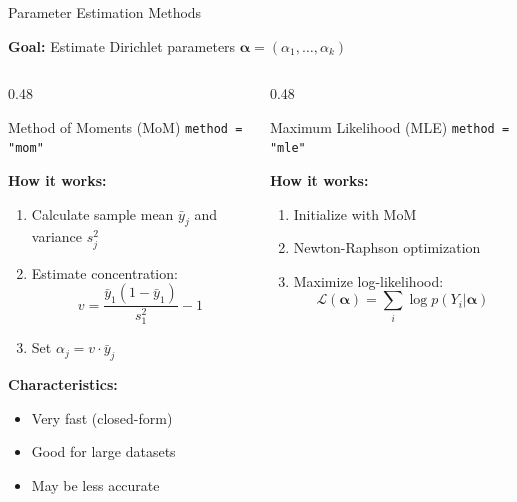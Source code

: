 \documentclass[aspectratio=169]{beamer}
\begin{document}
\begin{frame}{Parameter Estimation Methods}

\textbf{Goal:} Estimate Dirichlet parameters $\boldsymbol{\alpha} = (\alpha_1, \ldots, \alpha_k)$

\vspace{0.3cm}

\begin{columns}[T]

\begin{column}{0.48\textwidth}
\begin{block}{Method of Moments (MoM)}
\texttt{method = "mom"}
\end{block}

\textbf{How it works:}
\begin{enumerate}
\item Calculate sample mean $\bar{y}_j$ and variance $s_j^2$
\item Estimate concentration: 
$$v = \frac{\bar{y}_1(1-\bar{y}_1)}{s_1^2} - 1$$
\item Set $\alpha_j = v \cdot \bar{y}_j$
\end{enumerate}

\vspace{0.2cm}

\textbf{Characteristics:}
\begin{itemize}
\item Very fast (closed-form)
\item Good for large datasets
\item May be less accurate
\end{itemize}

\end{column}

\begin{column}{0.48\textwidth}
\begin{block}{Maximum Likelihood (MLE)}
\texttt{method = "mle"}
\end{block}

\textbf{How it works:}
\begin{enumerate}
\item Initialize with MoM
\item Newton-Raphson optimization
\item Maximize log-likelihood:
$$\mathcal{L}(\boldsymbol{\alpha}) = \sum_i \log p(Y_i | \boldsymbol{\alpha})$$
\end{enumerate}


\end{column}
\end{columns}
\end{frame}
\end{document}
